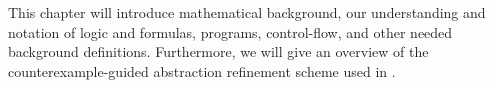 \newcommand{\stateSpace}{\ensuremath{S_{V, \mu}}}
\begin{comment}
	This chapter is mostly focused on trace abstraction $\rightarrow$  It introduces the reader to the concept of trace abstraction. \\
	- Introduce logic, logical variables, terms, formulas, transition formulas with primed and unprimed variables, programs, program states, loops $\rightarrow$  then program-, error traces, feasible and infeasible counterexamples, CFGs, interpolants. \\ - From intuitive to true definitions. \\
	Here the running example from the introduction gets dissected to illustrate the definitions. \\ 
	Further the problems loops can cause are introduced, followed by a definition of loop summaries $\rightarrow$ introduction reflexive transitive closure of a formula 
	15 pages
\end{comment}

This chapter will introduce mathematical background, our understanding and notation of logic and formulas, programs, control-flow, and other needed background definitions. Furthermore, we will give an overview of the \traceabstraction \cite{10.1007/978-3-642-03237-0_7} counterexample-guided abstraction refinement scheme used in \ultimate.

